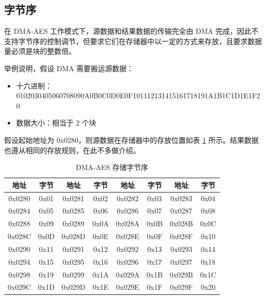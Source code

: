 \documentclass[main\_\_CN.tex]{subfiles}
\begin{document}
\subsection{字节序}

在 DMA-AES 工作模式下，源数据和结果数据的传输完全由 DMA 完成，因此不支持字节序的控制调节，但要求它们在存储器中以一定的方式来存放，且要求数据量必须是块的整数倍。

举例说明，假设 DMA 需要搬运源数据：

\begin{itemize}
    \item 十六进制： 0102030405060708090A0B0C0D0E0F101112131415161718191A1B1C1D1E1F20
    \item 数据大小：相当于 2 个块
\end{itemize}

假设起始地址为 0x0280，则源数据在存储器中的存放位置如表 \ref{tab:aes-dma-aes-plaintext-ciphertext-endian} 所示。结果数据也遵从相同的存放规则，在此不多做介绍。

\begin{longtable}[c]
{ |c|c|c|c|c|c|c|c|}
\caption{DMA-AES 存储字节序} 
\label{tab:aes-dma-aes-plaintext-ciphertext-endian}\\
\hline
\rowcolor{lightgray}
\textbf{地址} &  \textbf{字节}  & \textbf{地址} &  \textbf{字节}  & \textbf{地址} &  \textbf{字节}  & \textbf{地址} &  \textbf{字节} \\\hline
0x0280 & 0x01 & 0x0281 & 0x02 & 0x0282 & 0x03 & 0x0283 & 0x04 \\\hline
0x0284 & 0x05 & 0x0285 & 0x06 & 0x0286 & 0x07 & 0x0287 & 0x08 \\\hline
0x0288 & 0x09 & 0x0289 & 0x0A & 0x028A & 0x0B & 0x028B & 0x0C \\\hline
0x028C & 0x0D & 0x028D & 0x0E & 0x028E & 0x0F & 0x028F & 0x10 \\\hline
0x0290 & 0x11 & 0x0291 & 0x12 & 0x0292 & 0x13 & 0x0293 & 0x14 \\\hline
0x0294 & 0x15 & 0x0295 & 0x16 & 0x0296 & 0x17 & 0x0297 & 0x18 \\\hline
0x0298 & 0x19 & 0x0299 & 0x1A & 0x029A & 0x1B & 0x029B & 0x1C \\\hline
0x029C & 0x1D & 0x029D & 0x1E & 0x029E & 0x1F & 0x029F & 0x20 \\\hline
\end{longtable}

\end{document}
